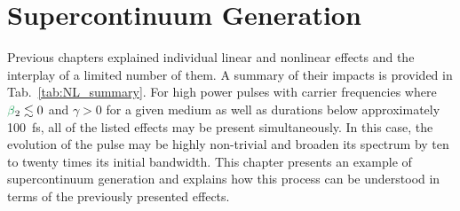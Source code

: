 \chapter{Supercontinuum Generation}
\label{ch:supercontinuum}

Previous chapters explained individual linear and nonlinear effects and the interplay of a limited number of them. A summary of their impacts is provided in Tab.~\ref{tab:NL_summary}. For high power pulses with carrier frequencies where $\betag_2\lesssim 0$ and $\gamma>0$ for a given medium as well as durations below approximately 100~fs, all of the listed effects may be present simultaneously. In this case, the evolution of the pulse may be highly non-trivial and broaden its spectrum by ten to twenty times its initial bandwidth. This chapter presents an example of supercontinuum generation and explains how this process can be understood in terms of the previously presented effects.   


